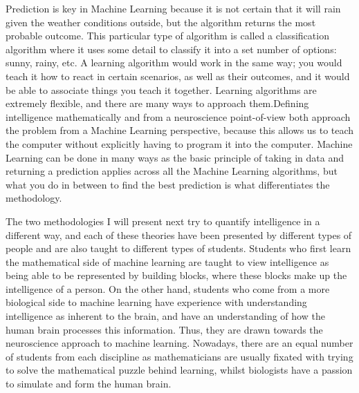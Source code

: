 \documentclass[11pt, oneside]{article}
\begin{document}
\par Prediction is key in Machine Learning because it is not certain that it will rain given the weather conditions outside, but the algorithm returns the most probable outcome. This particular type of algorithm is called a classification algorithm where it uses some detail to classify it into a set number of options: sunny, rainy, etc. A learning algorithm would work in the same way; you would teach it how to react in certain scenarios, as well as their outcomes, and it would be able to associate things you teach it together. Learning algorithms are extremely flexible, and there are many ways to approach them.Defining intelligence mathematically and from a neuroscience point-of-view both approach the problem from a Machine Learning perspective, because this allows us to teach the computer without explicitly having to program it into the computer. Machine Learning can be done in many ways as the basic principle of taking in data and returning a prediction applies across all the Machine Learning algorithms, but what you do in between to find the best prediction is what differentiates the methodology. 

\par The two methodologies I will present next try to quantify intelligence in a different way, and each of these theories have been presented by different types of people and are also taught to different types of students. Students who first learn the mathematical side of machine learning are taught to view intelligence as being able to be represented by building blocks, where these blocks make up the intelligence of a person. On the other hand, students who come from a more biological side to machine learning have experience with understanding intelligence as inherent to the brain, and have an understanding of how the human brain processes this information. Thus, they are drawn towards the neuroscience approach to machine learning. Nowadays, there are an equal number of students from each discipline as mathematicians are usually fixated with trying to solve the mathematical puzzle behind learning, whilst biologists have a passion to simulate and form the human brain.
\end{document}
